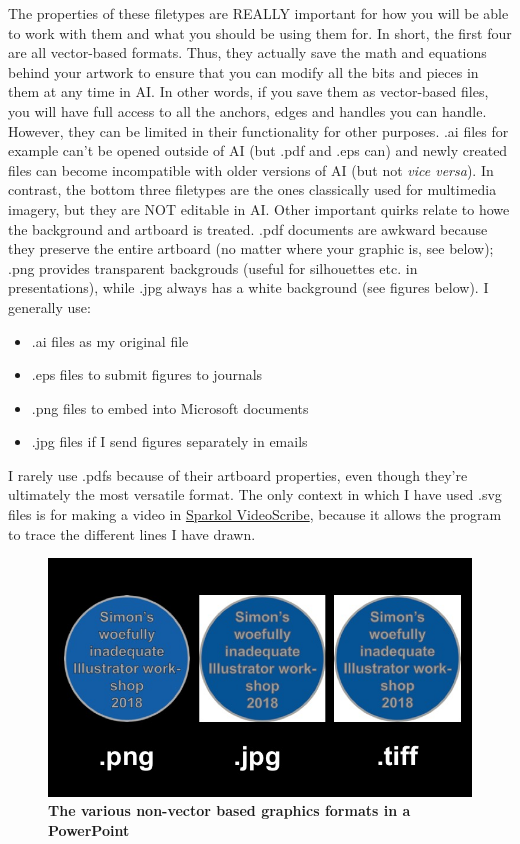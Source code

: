 \documentclass[]{article}
\providecommand{\tightlist}{%
  \setlength{\itemsep}{0pt}\setlength{\parskip}{0pt}}
\begin{document}
The properties of these filetypes are REALLY important for how you will
be able to work with them and what you should be using them for. In
short, the first four are all vector-based formats. Thus, they actually
save the math and equations behind your artwork to ensure that you can
modify all the bits and pieces in them at any time in AI. In other
words, if you save them as vector-based files, you will have full access
to all the anchors, edges and handles you can handle. However, they can
be limited in their functionality for other purposes. .ai files for
example can't be opened outside of AI (but .pdf and .eps can) and newly
created files can become incompatible with older versions of AI (but not
\emph{vice versa}). In contrast, the bottom three filetypes are the ones
classically used for multimedia imagery, but they are NOT editable in
AI. Other important quirks relate to howe the background and artboard is
treated. .pdf documents are awkward because they preserve the entire
artboard (no matter where your graphic is, see below); .png provides
transparent backgrouds (useful for silhouettes etc. in presentations),
while .jpg always has a white background (see figures below). I
generally use:

\begin{itemize}
\tightlist
\item
  .ai files as my original file
\item
  .eps files to submit figures to journals
\item
  .png files to embed into Microsoft documents
\item
  .jpg files if I send figures separately in emails
\end{itemize}

I rarely use .pdfs because of their artboard properties, even though
they're ultimately the most versatile format. The only context in which
I have used .svg files is for making a video in
\href{https://www.videoscribe.co/en/}{Sparkol VideoScribe}, because it
allows the program to trace the different lines I have drawn.

\begin{figure}
\centering
\includegraphics{Presentation1.jpg}
\caption{\textbf{The various non-vector based graphics formats in a
PowerPoint}}
\end{figure}
\end{document}
